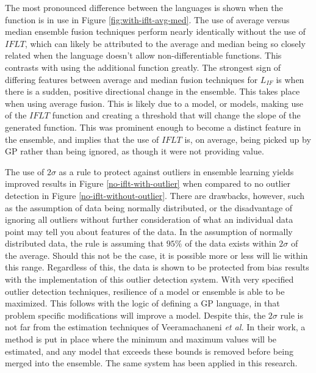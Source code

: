\documentclass[12pt, letterpaper]{article}
\begin{document}
\textrm{ \indent The most pronounced difference between the languages is shown when the function is in use in Figure \ref{fig:with-iflt-avg-med}. The use of average versus median ensemble fusion techniques perform nearly identically without the use of $IFLT$, which can likely be attributed to the average and median being so closely related when the language doesn't allow non-differentiable functions. This contrasts with using the additional function greatly. The strongest sign of differing features between average and median fusion techniques for $L_{IF}$ is when there is a sudden, positive directional change in the ensemble. This takes place when using average fusion. This is likely due to a model, or models, making use of the $IFLT$ function and creating a threshold that will change the slope of the generated function. This was prominent enough to become a distinct feature in the ensemble, and implies that the use of $IFLT$ is, on average, being picked up by GP rather than being ignored, as though it were not providing value. }

\textrm{ \indent The use of $2\sigma$ as a rule to protect against outliers in ensemble learning yields improved results in Figure \ref{no-iflt-with-outlier} when compared to no outlier detection in Figure \ref{no-iflt-without-outlier}. There are drawbacks, however, such as the assumption of data being normally distributed, or the disadvantage of ignoring all outliers without further consideration of what an individual data point may tell you about features of the data. In the assumption of normally distributed data, the rule is assuming that $95\%$ of the data exists within $2\sigma$ of the average. Should this not be the case, it is possible more or less will lie within this range. Regardless of this, the data is shown to be protected from bias results with the implementation of this outlier detection system. With very specified outlier detection techniques, resilience of a model or ensemble is able to be maximized. This follows with the logic of defining a GP language, in that problem specific modifications will improve a model. Despite this, the $2\sigma$ rule is not far from the estimation techniques of Veeramachaneni \textit{et al.} \cite{ensemble1}  In their work, a method is put in place where the minimum and maximum values will be estimated, and any model that exceeds these bounds is removed before being merged into the ensemble. The same system has been applied in this research. }
\end{document}
